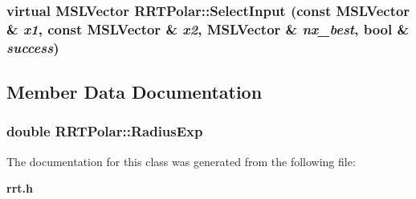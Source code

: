 \subsubsection{\setlength{\rightskip}{0pt plus 5cm}virtual {\bf MSLVector} RRTPolar::Select\-Input (const {\bf MSLVector} \& {\em x1}, const {\bf MSLVector} \& {\em x2}, {\bf MSLVector} \& {\em nx\_\-best}, bool \& {\em success})\hspace{0.3cm}{\tt  [protected, virtual]}}\label{class_RRTPolar_b1}




\subsection{Member Data Documentation}
\subsubsection{\setlength{\rightskip}{0pt plus 5cm}double RRTPolar::Radius\-Exp}\label{class_RRTPolar_m0}




The documentation for this class was generated from the following file:\begin{CompactItemize}
\item 
{\bf rrt.h}\end{CompactItemize}
